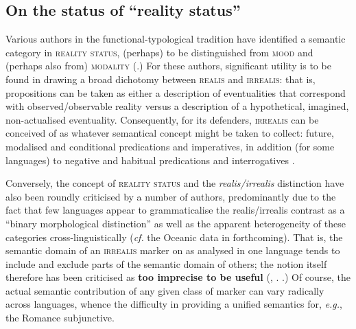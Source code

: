 \subsection{On the status of ``reality status''}
Various authors in the functional-typological tradition have identified a semantic category in \textsc{reality status}, (perhaps) to be distinguished from \textsc{mood} and (perhaps also from) \textsc{modality} (\citealp[see][]{Bowern1998,Elliott2000,Roberts1990a,Michael2014,McGregor2006,Mithun1995,Chafe1995}.) For these authors, significant utility is to be found in drawing a broad dichotomy between \textsc{realis} and \textsc{irrealis}: that is, propositions can be taken as either a description of eventualities that correspond with observed/observable reality versus a description of a hypothetical, imagined, non-actualised eventuality. Consequently, for its defenders, \textsc{irrealis} can be conceived of as whatever semantical concept might be taken to collect: future, modalised and conditional predications and imperatives, in addition (for some languages) to negative and habitual predications and interrogatives \citetext{\citealp*[see also][]{Palmer2001,Givon1994,Plungian2005,VonPrincea}~under~revision}.

Conversely, the concept of \textsc{reality status} and the \textit{realis/irrealis} distinction have also been roundly criticised by a number of authors, predominantly due to the fact that few languages appear to grammaticalise the realis/irrealis contrast as a ``binary morphological distinction'' as well as the apparent heterogeneity of these categories cross-linguistically (\textit{cf.} the Oceanic data in \citealp[][]{VonPrincea} forthcoming). That is, the semantic domain of an \textsc{irrealis} marker on as analysed in one language tends to include and exclude parts of the semantic domain of others; the notion itself therefore has been criticised as \textbf{too imprecise to be useful} (\citealp[see][238]{Bybee1994}, \citealp[\textit{apud}][158\textit{ff}]{Foley1986}. \citealp[See also, \textit{e.g.},][]{Bybee1998,Portner2018a,Haan2012}.) Of course, the actual semantic contribution of any given class of marker can vary radically across languages, whence the difficulty in providing a unified semantics for, \textit{e.g.}, the Romance subjunctive.

